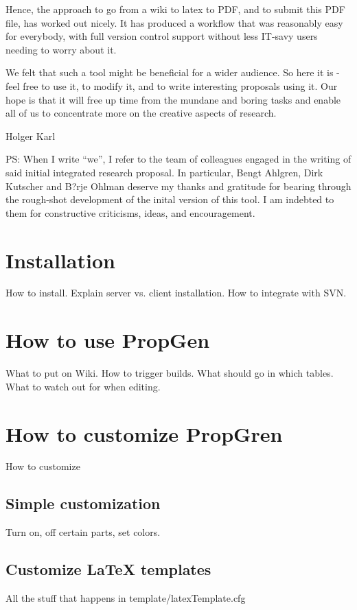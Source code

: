\documentclass[a4paper,10pt,english]{sphinxmanual}
\begin{document}
Hence, the approach to go from a wiki to latex to PDF, and to submit this PDF file, has worked out nicely. It has produced a workflow that was reasonably easy for everybody, with full version control support without less IT-savy users needing to worry about it.

We felt that such a tool might be beneficial for a wider audience. So here it is - feel free to use it, to modify it, and to write interesting proposals using it. Our hope is that it will free up time from the mundane and boring tasks and enable all of us to concentrate more on the creative aspects of research.

Holger Karl

PS: When I write ``we'', I refer to the team of colleagues engaged in the writing of said initial integrated research proposal. In particular, Bengt Ahlgren, Dirk Kutscher and B?rje Ohlman deserve my thanks and gratitude for bearing through the rough-shot development of the inital version of this tool. I am indebted to them for constructive criticisms, ideas, and encouragement.


\chapter{Installation}
\label{installation:installation}\label{installation::doc}
How to install. Explain server vs. client installation. How to integrate with SVN.


\chapter{How to use PropGen}
\label{usage:how-to-use-propgen}\label{usage::doc}
What to put on Wiki. How to trigger builds. What should go in which tables. What to watch out for when editing.


\chapter{How to customize PropGren}
\label{customize:how-to-customize-propgren}\label{customize::doc}
How to customize


\section{Simple customization}
\label{customize:simple-customization}
Turn on, off certain parts, set colors.


\section{Customize LaTeX templates}
\label{customize:customize-latex-templates}
All the stuff that happens in template/latexTemplate.cfg
\end{document}
